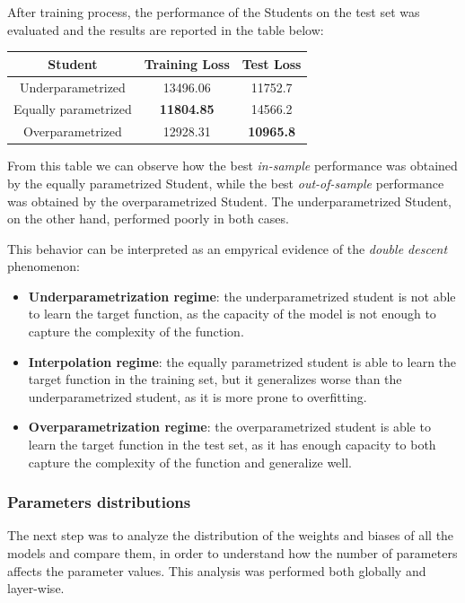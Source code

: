 \documentclass[a4paper, 10pt]{article}
\begin{document}
After training process, the performance of the Students on the test set was evaluated and the results are reported in the table below:
\begin{center}
    \begin{tabular}{c|c|c}
        \textbf{Student} & \textbf{Training Loss} & \textbf{Test Loss} \\
        \hline
        Underparametrized & 13496.06 & 11752.7 \\
        Equally parametrized & \textbf{11804.85} & 14566.2 \\
        Overparametrized & 12928.31 & \textbf{10965.8} \\
    \end{tabular}
    \label{tab:students_performance}
\end{center}

From this table we can observe how the best \textit{in-sample} performance was obtained by the equally parametrized Student, while the best \textit{out-of-sample} 
performance was obtained by the overparametrized Student. The underparametrized Student, on the other hand, performed poorly in both cases.

This behavior can be interpreted as an empyrical evidence of the \textit{double descent} phenomenon:
\begin{itemize}
    \item \textbf{Underparametrization regime}: the underparametrized student is not able to learn the target function, as the capacity of the model is
    not enough to capture the complexity of the function.
    \item \textbf{Interpolation regime}: the equally parametrized student is able to learn the target function in the training set, but it generalizes worse than
    the underparametrized student, as it is more prone to overfitting.
    \item \textbf{Overparametrization regime}: the overparametrized student is able to learn the target function in the test set, as it has enough capacity to
    both capture the complexity of the function and generalize well.
\end{itemize}

\subsubsection{Parameters distributions}
The next step was to analyze the distribution of the weights and biases of all the models and compare them, in order to understand how the number of parameters
affects the parameter values. This analysis was performed both globally and layer-wise.
\end{document}
